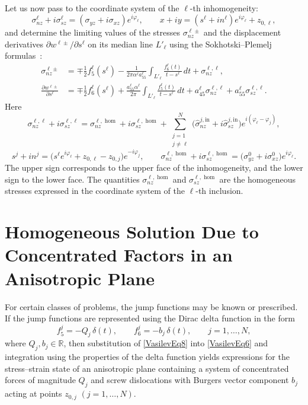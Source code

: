 Let us now pass to the coordinate system of the $\ell$-th inhomogeneity:
\[
\sigma_{nz}^{\ell}+i\sigma_{sz}^{\ell}
=
(\sigma_{yz}+i\sigma_{xz})e^{i\varphi_\ell},
\qquad
x+iy=(s^\ell+in^\ell)e^{i\varphi_\ell}+z_{0,\ell},
\]
and determine the limiting values of the stresses $\sigma_{nz}^{\ell\pm}$ and the displacement derivatives $\partial w^{\ell\pm}/\partial s^\ell$ on its median line $L'_\ell$ using the Sokhotski--Plemelj formulas~\cite{Vasilev17,Vasilev25}:
\begin{equation}
	\begin{aligned}
		\sigma_{nz}^{\ell\pm}
		&=
		\mp\frac{1}{2}f_5^\ell(s^\ell)
		-\frac{1}{2\pi\alpha^\ell a_{55}^\ell}\int_{L'_\ell}\frac{f_6^\ell(t)}{t-s^\ell}\,dt
		+\sigma_{nz}^{\ell,\ell},\\
		\frac{\partial w^{\ell\pm}}{\partial s^\ell}
		&=
		\mp\frac{1}{2}f_6^\ell(s^\ell)
		+\frac{a_{55}^\ell\alpha^\ell}{2\pi}\int_{L'_\ell}\frac{f_5^\ell(t)}{t-s^\ell}\,dt
		+a_{45}^\ell\sigma_{nz}^{\ell,\ell}
		+a_{55}^\ell\sigma_{sz}^{\ell,\ell}.
	\end{aligned}
	\label{VasilevEq7}
\end{equation}
Here
\[
\sigma_{nz}^{\ell,\ell}+i\sigma_{sz}^{\ell,\ell}
=
\sigma_{nz}^{\ell,\hom}+i\sigma_{sz}^{\ell,\hom}
+
\sum_{\substack{j=1\\ j\ne \ell}}^{N}
\bigl(\widehat{\sigma}_{nz}^{j,\mathrm{in}}+i\widehat{\sigma}_{sz}^{j,\mathrm{in}}\bigr)
e^{i(\varphi_\ell-\varphi_j)},
\]
\[
s^j+in^j
=
\bigl(s^\ell e^{i\varphi_\ell}+z_{0,\ell}-z_{0,j}\bigr)e^{-i\varphi_j},
\qquad
\sigma_{nz}^{\ell,\hom}+i\sigma_{sz}^{\ell,\hom}
=
\bigl(\sigma_{yz}^{0}+i\sigma_{xz}^{0}\bigr)e^{i\varphi_\ell}.
\]
The upper sign corresponds to the upper face of the inhomogeneity, and the lower sign to the lower face. The quantities $\sigma_{nz}^{\ell,\hom}$ and $\sigma_{sz}^{\ell,\hom}$ are the homogeneous stresses expressed in the coordinate system of the $\ell$-th inclusion.

\section{Homogeneous Solution Due to Concentrated Factors in an Anisotropic Plane}

For certain classes of problems, the jump functions may be known or prescribed.
If the jump functions are represented using the Dirac delta function in the form
\begin{equation}
	f_5^{j}=-Q_j\,\delta(t),
	\qquad
	f_6^{j}=-b_j\,\delta(t),
	\qquad
	j=1,\ldots,N,
	\label{VasilevEq8}
\end{equation}
where $Q_j,b_j\in\mathbb{R}$, then substitution of \eqref{VasilevEq8} into \eqref{VasilevEq6} and integration using the properties of the delta function yields expressions for the stress--strain state of an anisotropic plane containing a system of concentrated forces of magnitude $Q_j$ and screw dislocations with Burgers vector component $b_j$ acting at points $z_{0,j}$ $(j=1,\ldots,N)$.


